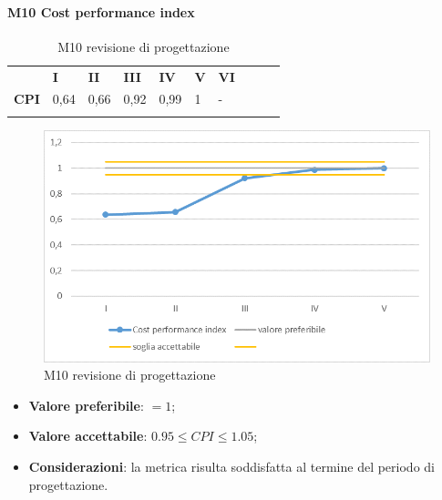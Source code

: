 \paragraph{M10 Cost performance index} \mbox{}
\begin{longtable}[H!] {						
		>{}p{50mm}  		
		>{}p{8mm}
		>{}p{8mm}		
		>{}p{8mm}		
		>{}p{8mm}		
		>{}p{8mm}		
		>{}p{8mm}
		>{}p{8mm}
		>{}p{8mm}
		>{}p{8mm}
	}
	\rowcolor{gray!50}
	\textbf{} & \textbf{I} & \textbf{II} & \textbf{III} & \textbf{IV} & \textbf{V} & \textbf{VI} \TBstrut \\ [2mm]
	\textbf{CPI} & 0,64 & 0,66 & 0,92 & 0,99 & 1 & - \TBstrut \\ [2mm]
	\rowcolor{white}
	\caption{M10 revisione di progettazione}
\end{longtable}
\begin{figure}[H] 	
\includegraphics[width=\linewidth]{./img/grafici/RP7.png}	
\caption{M10 revisione di progettazione}	
\end{figure}
\begin{itemize}
	\item \textbf{Valore preferibile}: $=1$;
	\item \textbf{Valore accettabile}: $0.95 \le CPI \le 1.05$;
	\item \textbf{Considerazioni}: la metrica risulta soddisfatta al termine del periodo di progettazione.
\end{itemize}

